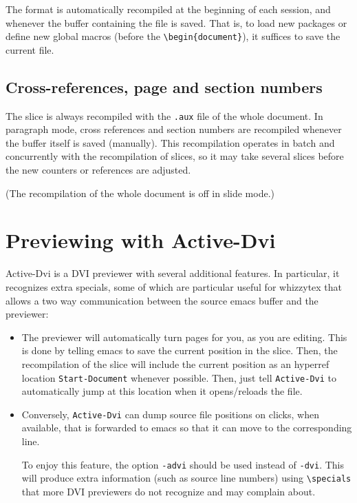 \documentclass{article}
\let \lst \verb
\begin{document}
The format is automatically recompiled at the beginning of each session, and
whenever the buffer containing the file is saved. That is, to load new
packages or define new global macros (before the \lst"\begin{document}"), it
suffices to save the current file.

\subsection {Cross-references, page and section numbers} 

The slice is always recompiled with the \lst".aux" file of the whole
document.  In paragraph mode, cross references and section numbers are 
recompiled whenever the buffer itself is saved (manually). 
This recompilation operates in batch and concurrently with the recompilation
of slices, so it may take several slices before the new counters or
references are adjusted.

(The recompilation of the whole document is off in slide mode.) 


\section {Previewing with Active-Dvi}

Active-Dvi is a DVI previewer with several additional features.
In particular, it recognizes extra specials, some of which are particular 
useful for whizzytex that allows a two way communication between 
the source emacs buffer and the previewer: 
\begin {itemize}
\item
The previewer will automatically turn pages for you, as you are editing. 
This is done by telling emacs to save the current position in the slice. 
Then, the recompilation of the slice will include the current position 
as an hyperref location \lst"Start-Document" whenever possible. 
Then, just tell \lst"Active-Dvi" to automatically jump at this location
when it opens/reloads the file. 

\item
Conversely, \lst"Active-Dvi" can dump source file positions on clicks, 
when available, that is forwarded to emacs so that it can move to the
corresponding line.

To enjoy this feature, the option \lst"-advi" should be used instead of
\lst"-dvi". This will produce extra information (such as source line
numbers) using \lst"\specials" that more DVI previewers do not recognize
and may complain about.



\end{itemize}
\end{document}
\end{document}
